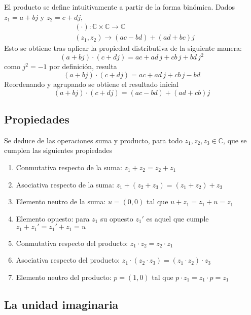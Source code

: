 El producto se define intuitivamente a partir de la forma binómica. Dados $z_1=a+bj$ y $z_2=c+dj$,
\begin{align*}
  &(\cdot) : \mathbb{C}\times\mathbb{C}\to\mathbb{C}\\ 
  &(z_1,z_2)\rightarrow (ac-bd) + (ad+bc)j
\end{align*}
Esto se obtiene tras aplicar la propiedad distributiva de la siguiente manera:
\begin{equation*}
  (a+bj)\cdot(c+dj) = ac + ad\,j + cb\,j + bd\,j^2
\end{equation*}
como $j^2=-1$ por definición, resulta
\begin{equation*}
  (a+bj)\cdot(c+dj) = ac + ad\,j + cb\,j - bd
\end{equation*}
Reordenando y agrupando se obtiene el resultado inicial
\begin{equation*}
  (a+bj)\cdot(c+dj) = (ac-bd) + (ad+cb)j
\end{equation*}

\subsection{Propiedades}

Se deduce de las operaciones suma y producto, para todo $z_1,z_2,z_3 \in \mathbb{C}$, que se cumplen las siguientes propiedades
\begin{enumerate}
  \item Conmutativa respecto de la suma: $z_1 + z_2 = z_2 + z_1$
  \item Asociativa respecto de la suma: $z_1 + (z_2 + z_3) = (z_1 + z_2) + z_3$
  \item Elemento neutro de la suma: $u=(0,0)$ tal que $u + z_1 = z_1 + u = z_1$
  \item Elemento opuesto: para $z_1$ su opuesto $z_1'$ es aquel que cumple $z_1 + z_1' = z_1' + z_1 = u$
  \item Conmutativa respecto del producto: $z_1 \cdot z_2 = z_2 \cdot z_1$
  \item Asociativa respecto del producto: $z_1 \cdot (z_2 \cdot z_3) = (z_1 \cdot z_2)\cdot z_3$
  \item Elemento neutro del producto: $p=(1,0)$ tal que $p\cdot z_1 = z_1 \cdot p = z_1$
\end{enumerate}

\subsection{La unidad imaginaria}


